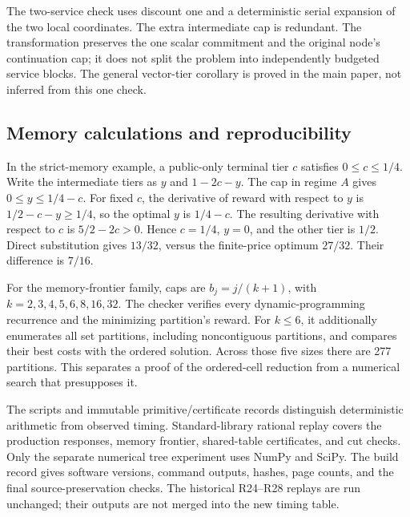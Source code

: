 The two-service check uses discount one and a deterministic serial expansion of the two local coordinates. The extra intermediate cap is redundant. The transformation preserves the one scalar commitment and the original node's continuation cap; it does not split the problem into independently budgeted service blocks. The general vector-tier corollary is proved in the main paper, not inferred from this one check.

\subsection{Memory calculations and reproducibility}
In the strict-memory example, a public-only terminal tier $c$ satisfies $0\leq c\leq1/4$. Write the intermediate tiers as $y$ and $1-2c-y$. The cap in regime $A$ gives $0\leq y\leq1/4-c$. For fixed $c$, the derivative of reward with respect to $y$ is $1/2-c-y\geq1/4$, so the optimal $y$ is $1/4-c$. The resulting derivative with respect to $c$ is $5/2-2c>0$. Hence $c=1/4$, $y=0$, and the other tier is $1/2$. Direct substitution gives $13/32$, versus the finite-price optimum $27/32$. Their difference is $7/16$.

For the memory-frontier family, caps are $b_j=j/(k+1)$, with $k=2,3,4,5,6,8,16,32$. The checker verifies every dynamic-programming recurrence and the minimizing partition's reward. For $k\leq6$, it additionally enumerates all set partitions, including noncontiguous partitions, and compares their best costs with the ordered solution. Across those five sizes there are 277 partitions. This separates a proof of the ordered-cell reduction from a numerical search that presupposes it.

The scripts and immutable primitive/certificate records distinguish deterministic arithmetic from observed timing. Standard-library rational replay covers the production responses, memory frontier, shared-table certificates, and cut checks. Only the separate numerical tree experiment uses NumPy and SciPy. The build record gives software versions, command outputs, hashes, page counts, and the final source-preservation checks. The historical R24--R28 replays are run unchanged; their outputs are not merged into the new timing table.
